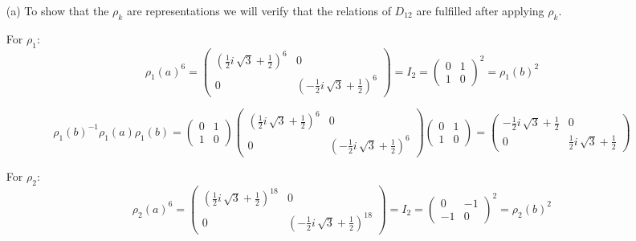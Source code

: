 \documentclass[10pt]{article}
\theoremstyle{plain}
\theoremstyle{remark}
\begin{document}
\begin{enumerate}
\item[(a)] To show that the $\rho_k$ are representations we will verify that
  the relations of $D_{12}$ are fulfilled after applying $\rho_k$.

  For $\rho_1$:
  \[
    \rho_1(a)^6=
    \left(
      \begin{array}{rr}
        {\left(\frac{1}{2} i \, \sqrt{3} + \frac{1}{2}\right)}^{6} & 0 \\
        0 & {\left(-\frac{1}{2} i \, \sqrt{3} + \frac{1}{2}\right)}^{6}
      \end{array}
    \right)
    =
    I_2
    =
    \left(
      \begin{array}{rr}
        0 & 1 \\
        1 & 0
      \end{array}
    \right)^2
    =
    \rho_1(b)^2
  \]

  \[
    \rho_1(b)^{-1}\rho_1(a)\rho_1(b)
    =
    \left(
      \begin{array}{rr}
        0 & 1 \\
        1 & 0
      \end{array}
    \right)
    \left(
      \begin{array}{rr}
        {\left(\frac{1}{2} i \, \sqrt{3} + \frac{1}{2}\right)}^{6} & 0 \\
        0 & {\left(-\frac{1}{2} i \, \sqrt{3} + \frac{1}{2}\right)}^{6}
      \end{array}
    \right)
    \left(
      \begin{array}{rr}
        0 & 1 \\
        1 & 0
      \end{array}
    \right)
    =
    \left(
      \begin{array}{rr}
        -\frac{1}{2} i \, \sqrt{3} + \frac{1}{2} & 0 \\
        0 & \frac{1}{2} i \, \sqrt{3} + \frac{1}{2}
      \end{array}
    \right)
  \]

  For $\rho_2$:
    \[
    \rho_2(a)^6=
    \left(\begin{array}{rr}
{\left(\frac{1}{2} i \, \sqrt{3} + \frac{1}{2}\right)}^{18} & 0 \\
0 & {\left(-\frac{1}{2} i \, \sqrt{3} + \frac{1}{2}\right)}^{18}
\end{array}\right)
    =
    I_2
    =
    \left(
      \begin{array}{rr}
        0 & -1 \\
        -1 & 0
      \end{array}
    \right)^2
    =
    \rho_2(b)^2
  \]


\end{enumerate}
\end{document}
